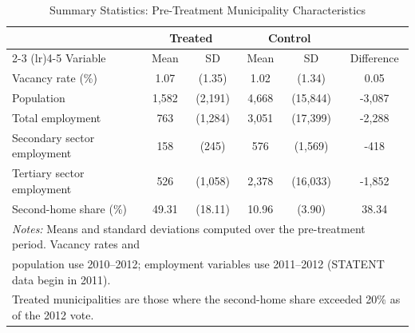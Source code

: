 \begin{table}[htbp]
\centering
\caption{Summary Statistics: Pre-Treatment Municipality Characteristics}
\label{tab:sumstats}
\small
\begin{tabular}{l cc cc c}
\toprule
 & \multicolumn{2}{c}{Treated} & \multicolumn{2}{c}{Control} & \\
\cmidrule(lr){2-3} \cmidrule(lr){4-5}
Variable & Mean & SD & Mean & SD & Difference \\
\midrule
Vacancy rate (\%) & 1.07 & (1.35) & 1.02 & (1.34) & 0.05 \\
Population & 1,582 & (2,191) & 4,668 & (15,844) & -3,087 \\
Total employment & 763 & (1,284) & 3,051 & (17,399) & -2,288 \\
Secondary sector employment & 158 & (245) & 576 & (1,569) & -418 \\
Tertiary sector employment & 526 & (1,058) & 2,378 & (16,033) & -1,852 \\
Second-home share (\%) & 49.31 & (18.11) & 10.96 & (3.90) & 38.34 \\
\bottomrule
\multicolumn{6}{l}{\footnotesize \textit{Notes:} Means and standard deviations computed over the pre-treatment period. Vacancy rates and} \\
\multicolumn{6}{l}{\footnotesize population use 2010--2012; employment variables use 2011--2012 (STATENT data begin in 2011).} \\
\multicolumn{6}{l}{\footnotesize Treated municipalities are those where the second-home share exceeded 20\% as of the 2012 vote.} \\
\end{tabular}
\end{table}
